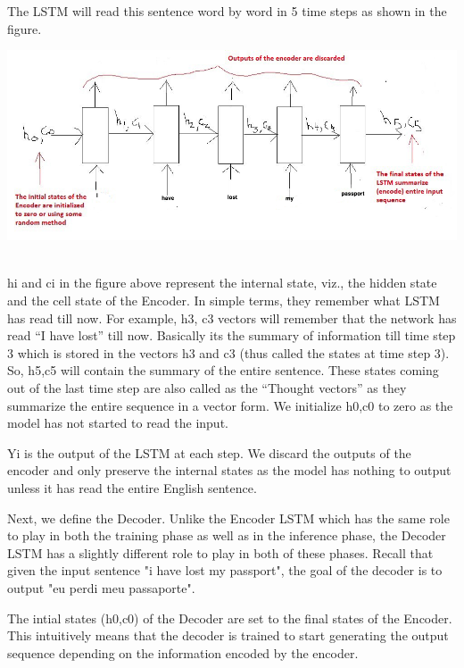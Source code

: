 \documentclass[runningheads]{llncs}
\begin{document}
	The LSTM will read this sentence word by word in 5 time steps as shown in the figure.
	
	\begin{minipage}{\linewidth}
		\begin{center}
			\includegraphics[width=\linewidth]{EncoderLSTM.jpeg}
			\label{fig:Encoder LSTM}~\cite{ref_url5}
		\end{center}
	\end{minipage}
	\afterpage{\clearpage}
	
 	h{i} and c{i} in the figure above represent the internal state, viz., the hidden state and the cell state of the Encoder. In simple terms, they remember what LSTM has read till now. 
 	For example, 
 	h{3}, c{3} vectors will remember that the network has read “I have lost” till now. Basically its the summary of information till time step 3 which is stored in the vectors h3 and c3 (thus called the states at time step 3). So, h{5},c{5} will contain the summary of the entire sentence. These states coming out of the last time step are also called as the “Thought vectors” as they summarize the entire sequence in a vector form. We initialize h{0},c{0} to zero as the model has not started to read the input.
 	
 	Y{i} is the output of the LSTM at each step. We discard the outputs of the encoder and only preserve the internal states as the model has nothing to output unless it has read the entire English sentence.
	
	Next, we define the Decoder. Unlike the Encoder LSTM which has the same role to play in both the training phase as well as in the inference phase, the Decoder LSTM has a slightly different role to play in both of these phases. Recall that given the input sentence "i have lost my passport", the goal of the decoder is to output "eu perdi meu passaporte". 

	The intial states (h{0},c{0}) of the Decoder are set to the final states of the Encoder. This intuitively means that the decoder is trained to start generating the output sequence depending on the information encoded by the encoder.
	
\end{document}
